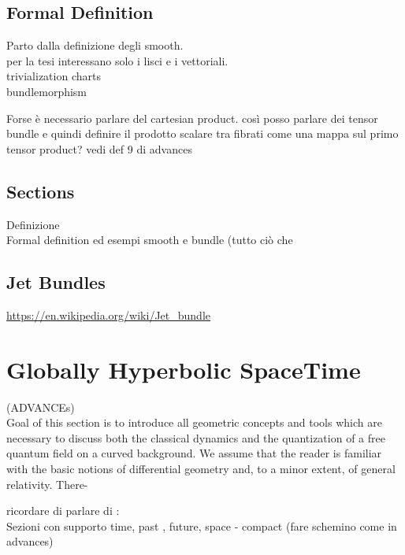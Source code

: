 \documentclass[Main]{subfiles}
\begin{document}
			\subsection{Formal Definition}
			Parto dalla definizione degli smooth.\\
			per la tesi interessano solo i lisci e i vettoriali.\\
			trivialization charts\\
			bundlemorphism\\
			\begin{Warning}
				Forse è necessario parlare del cartesian product. così posso parlare dei tensor bundle e quindi definire il prodotto scalare tra fibrati come una mappa sul primo tensor product?
				vedi def 9 di advances
				
			\end{Warning}			
			
			\subsection{Sections}
			Definizione\\
			
Formal definition ed esempi smooth e bundle (tutto ciò che 

			\subsection{Jet Bundles}
				\url{https://en.wikipedia.org/wiki/Jet_bundle}
				


	\section{Globally Hyperbolic SpaceTime}
		\begin{Warning}
		(ADVANCEs)\\
		Goal of this section is to introduce all geometric concepts and tools which are necessary to discuss both the classical dynamics and the quantization of a free quantum field on a curved background. We assume that the reader is familiar with the basic notions of differential geometry and, to a minor extent, of general relativity. There-
		\end{Warning}
		
		ricordare di parlare di :
		\\ Sezioni con supporto time, past , future, space - compact (fare schemino come in advances)
		
\end{document}
